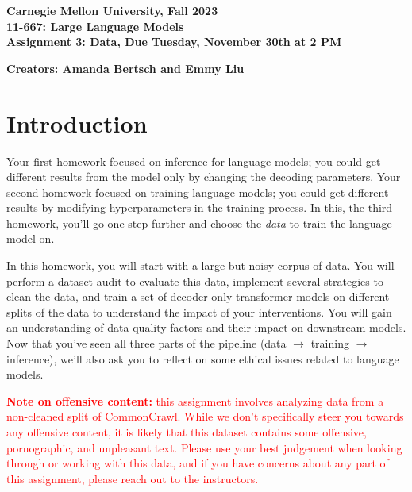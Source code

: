 \documentclass[leqno,12pt]{article}
\newcommand{\Term}{Fall 2023}
\newcommand{\Course}{11-667: Large Language Models}
\newcommand{\Assignment}{Assignment 3: Data}
\newcommand{\DueDate}{Tuesday, November 30th at 2 PM}
\begin{document}
\begin{center}

\textbf{Carnegie Mellon University,  \Term} \\
\textbf{\Course} \\
\textbf{\Assignment, Due \DueDate}

\textbf{Creators: Amanda Bertsch and Emmy Liu}

\end{center}


\tableofcontents
\newpage

\section*{Introduction}

Your first homework focused on inference for language models; you could get different results from the model only by changing the decoding parameters. Your second homework focused on training language models; you could get different results by modifying hyperparameters in the training process. In this, the third homework, you'll go one step further and choose the \textit{data} to train the language model on.

In this homework, you will start with a large but noisy corpus of data. You will perform a dataset audit to evaluate this data, implement several strategies to clean the data, and train a set of decoder-only transformer models on different splits of the data to understand the impact of your interventions. You will gain an understanding of data quality factors and their impact on downstream models. Now that you've seen all three parts of the pipeline (data $\rightarrow$ training $\rightarrow$ inference), we'll also ask you to reflect on some ethical issues related to language models. 

\textcolor{red}{\textbf{Note on offensive content:} this assignment involves analyzing data from a non-cleaned split of CommonCrawl. While we don't specifically steer you towards any offensive content, it is likely that this dataset contains some offensive, pornographic, and unpleasant text. Please use your best judgement when looking through or working with this data, and if you have concerns about any part of this assignment, please reach out to the instructors.}
\
\end{document}
